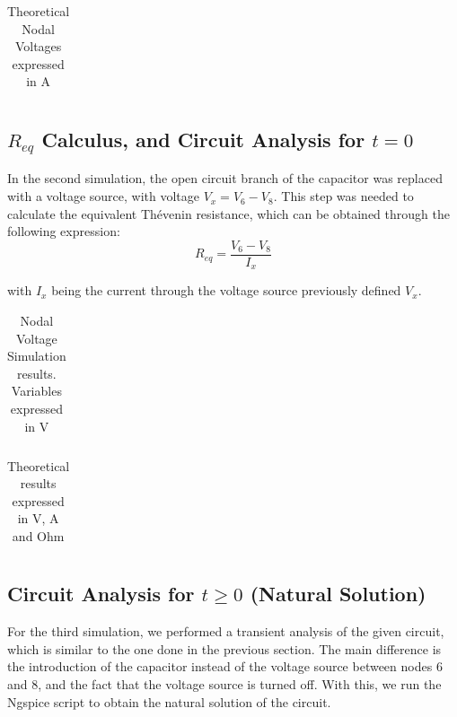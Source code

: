 \begin{table}[h]
\centering
\begin{tabularx}{0.6\textwidth} {
  | >{\raggedright\arraybackslash}X
  | >{\raggedleft\arraybackslash}X | }
 \hline

\end{tabularx}
\caption{Theoretical Nodal Voltages expressed in A}
\end{table}

\subsection{$R_{eq}$ Calculus, and Circuit Analysis for $t=0$}

In the second simulation, the open circuit branch of the capacitor was replaced with a voltage source, with voltage $V_x=V_6-V_8$. This step was needed to calculate the equivalent Thévenin resistance, which can be obtained through the following expression:
\begin{equation}
     R_{eq}=\frac{V_6-V_8}{I_x}
\end{equation}


with $I_x$ being the current through the voltage source previously defined $V_x$.

\begin{table}[h]
\centering
\begin{tabularx}{0.6\textwidth} {
  | >{\raggedright\arraybackslash}X
  | >{\raggedleft\arraybackslash}X | }
 \hline

\end{tabularx}
\caption{Nodal Voltage Simulation results. Variables expressed in V}
\end{table}

\begin{table}[h]
\centering
\begin{tabularx}{0.6\textwidth} {
  | >{\raggedright\arraybackslash}X
  | >{\raggedleft\arraybackslash}X | }
 \hline

\end{tabularx}
\caption{Theoretical results expressed in V, A and Ohm}
\end{table}

\newpage
\subsection{Circuit Analysis for $t \geq 0 $ (Natural Solution)}

For the third simulation, we performed a transient analysis of the given circuit, which is similar to the one done in the previous section. The main difference is the introduction of the capacitor instead of the voltage source between nodes 6 and 8, and the fact that the voltage source is turned off. With this, we run the Ngspice script to obtain the natural solution of the circuit.

